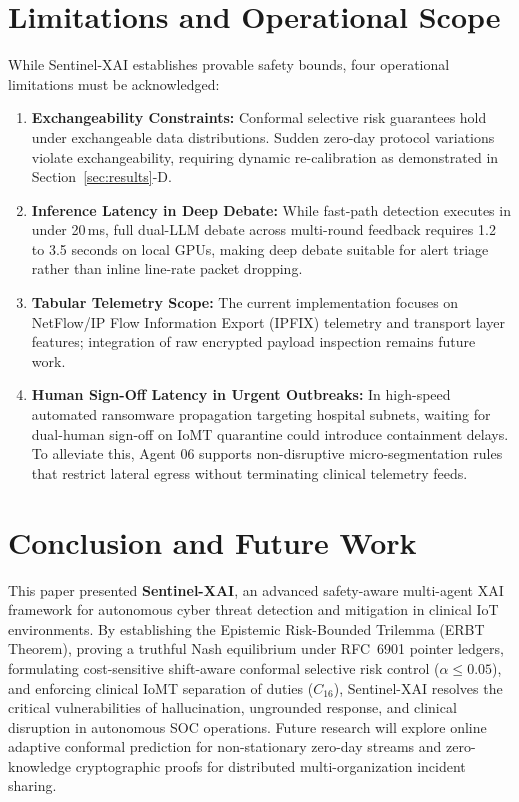 \documentclass{ieeeaccess}
\begin{document}
\section{Limitations and Operational Scope}
\label{sec:limitations}
While Sentinel-XAI establishes provable safety bounds, four operational limitations must be acknowledged:
\begin{enumerate}
    \item \textbf{Exchangeability Constraints:} Conformal selective risk guarantees hold under exchangeable data distributions. Sudden zero-day protocol variations violate exchangeability, requiring dynamic re-calibration as demonstrated in Section~\ref{sec:results}-D.
    \item \textbf{Inference Latency in Deep Debate:} While fast-path detection executes in under 20\,ms, full dual-LLM debate across multi-round feedback requires 1.2 to 3.5 seconds on local GPUs, making deep debate suitable for alert triage rather than inline line-rate packet dropping.
    \item \textbf{Tabular Telemetry Scope:} The current implementation focuses on NetFlow/IP Flow Information Export (IPFIX) telemetry and transport layer features; integration of raw encrypted payload inspection remains future work.
    \item \textbf{Human Sign-Off Latency in Urgent Outbreaks:} In high-speed automated ransomware propagation targeting hospital subnets, waiting for dual-human sign-off on IoMT quarantine could introduce containment delays. To alleviate this, Agent 06 supports non-disruptive micro-segmentation rules that restrict lateral egress without terminating clinical telemetry feeds.
\end{enumerate}

\section{Conclusion and Future Work}
\label{sec:conclusion}
This paper presented \textbf{Sentinel-XAI}, an advanced safety-aware multi-agent XAI framework for autonomous cyber threat detection and mitigation in clinical IoT environments. By establishing the Epistemic Risk-Bounded Trilemma (ERBT Theorem), proving a truthful Nash equilibrium under RFC~6901 pointer ledgers, formulating cost-sensitive shift-aware conformal selective risk control ($\alpha \le 0.05$), and enforcing clinical IoMT separation of duties ($C_{16}$), Sentinel-XAI resolves the critical vulnerabilities of hallucination, ungrounded response, and clinical disruption in autonomous SOC operations. Future research will explore online adaptive conformal prediction for non-stationary zero-day streams and zero-knowledge cryptographic proofs for distributed multi-organization incident sharing.
\end{document}
